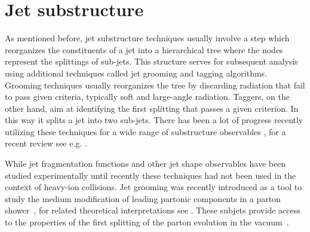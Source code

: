 
\section{Jet substructure}
\label{sec:jetsubstructure}

As mentioned before, jet substructure techniques usually involve a step which reorganizes the constituents of a jet into a hierarchical tree where the nodes represent the splittings of sub-jets. 
This structure serves for subsequent analysis using additional techniques called jet grooming and tagging algorithms.
Grooming techniques usually reorganizes the tree by discarding radiation that fail to pass given criteria, typically soft and large-angle radiation. Taggers, on the other hand, aim at identifying the first splitting that passes a given criterion. In this way it splits a jet into two sub-jets. There has been a lot of progress recently utilizing these techniques for a wide range of substructure observables \cite{Butterworth:2008iy,Ellis:2009me,Krohn:2009th,Dasgupta:2013ihk,Larkoski:2014wba}, for a recent review see e.g. \cite{Larkoski:2017jix}.

While jet fragmentation functions and other jet shape observables have been studied experimentally until recently these techniques had not been used in the context of heavy-ion collisions.
Jet grooming was recently introduced as a tool to study the medium modification of leading partonic components in a parton shower~\cite{Sirunyan:2017bsd}, for related theoretical interpretations see \cite{Chien:2016led,Mehtar-Tani:2016aco,Milhano:2017nzm,Chang:2017gkt}. 
These subjets provide access to the properties of the first splitting of the parton evolution in the vacuum~\cite{Altarelli:1977zs,Larkoski:2015lea}.


